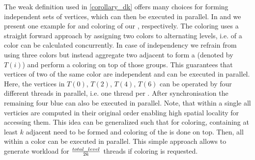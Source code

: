  The weak definition used in \cref{corollary_dk} offers many choices for forming \DK independent sets of vertices, which can then be executed in parallel. 
 In    and  we present one example for \DONE and \DTWO coloring of our \stex, respectively. The \DONE coloring uses a straight forward approach by assigning two colors to alternating levels, i.e. \levels of a color can be calculated concurrently. In case of \DTWO independency we refrain from using three colors but instead aggregate two adjacent \levels to form a \levelGroup (denoted by $T(i)$) and perform a \DONE coloring on top of those groups. This guarantees that vertices of two \levelGroups of the same color are \DTWO independent and can be executed in parallel. Here, the vertices in $T(0)$, $T(2)$, $T(4)$, $T(6)$ can be operated by four different threads in parallel, i.e. one thread per \levelGroup.  After synchronisation the remaining four blue \levelGroups can also be executed in parallel. Note, that within a single \levelGroup all verticies are computed in their original order enabling high spatial locality for accessing them. This idea can be generalized such that for \DK coloring, \levelGroups containing at least $k$ adjacent \levels need to be formed and \DONE coloring of the \levelGroups is done on top. Then, all \levelGroups within a color can be executed in parallel. This simple approach allows to generate workload for $\frac{total\_level}{2 k}$ threads if \DK coloring is requested.
 
